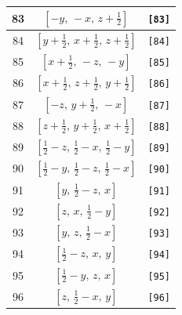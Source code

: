 \documentclass[fleqn,8pt]{jsarticle}
\begin{document}
\begin{longtable}{ccc}
83 & $\left[ - y,\, - x,\, z + \frac{1}{2} \right]$ & {\tt [83]} \\ \hline
84 & $\left[ y + \frac{1}{2},\, x + \frac{1}{2},\, z + \frac{1}{2} \right]$ & {\tt [84]} \\ \hline
85 & $\left[ x + \frac{1}{2},\, - z,\, - y \right]$ & {\tt [85]} \\ \hline
86 & $\left[ x + \frac{1}{2},\, z + \frac{1}{2},\, y + \frac{1}{2} \right]$ & {\tt [86]} \\ \hline
87 & $\left[ - z,\, y + \frac{1}{2},\, - x \right]$ & {\tt [87]} \\ \hline
88 & $\left[ z + \frac{1}{2},\, y + \frac{1}{2},\, x + \frac{1}{2} \right]$ & {\tt [88]} \\ \hline
89 & $\left[ \frac{1}{2} - z,\, \frac{1}{2} - x,\, \frac{1}{2} - y \right]$ & {\tt [89]} \\ \hline
90 & $\left[ \frac{1}{2} - y,\, \frac{1}{2} - z,\, \frac{1}{2} - x \right]$ & {\tt [90]} \\ \hline
91 & $\left[ y,\, \frac{1}{2} - z,\, x \right]$ & {\tt [91]} \\ \hline
92 & $\left[ z,\, x,\, \frac{1}{2} - y \right]$ & {\tt [92]} \\ \hline
93 & $\left[ y,\, z,\, \frac{1}{2} - x \right]$ & {\tt [93]} \\ \hline
94 & $\left[ \frac{1}{2} - z,\, x,\, y \right]$ & {\tt [94]} \\ \hline
95 & $\left[ \frac{1}{2} - y,\, z,\, x \right]$ & {\tt [95]} \\ \hline
96 & $\left[ z,\, \frac{1}{2} - x,\, y \right]$ & {\tt [96]} \\
\end{longtable}
\end{document}
